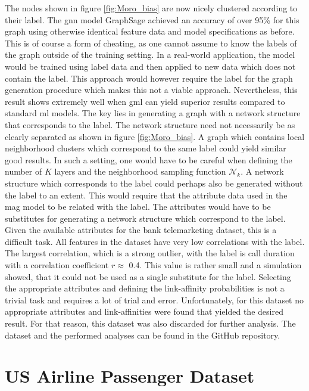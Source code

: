   \noindent The nodes shown in figure \ref{fig:Moro_bias} are now nicely
  clustered according to their label. The \acs{gnn} model GraphSage achieved an 
  accuracy of over 95\% for this graph using otherwise identical feature data
  and model specifications as before. This is of course a form of cheating, as 
  one cannot assume to know the labels of the graph outside of the training 
  setting. In a real-world application, the model would be trained using label
  data and then applied to new data which does not contain the label. This
  approach would however require the label for the graph generation procedure 
  which makes this not a viable approach. Nevertheless, this result shows 
  extremely well when \acs{gml} can yield superior results compared to standard 
  \acs{ml} models. The key lies in generating a graph with a network structure 
  that corresponds to the label. The network structure need not necessarily be 
  as clearly separated as shown in figure \ref{fig:Moro_bias}. A graph which 
  contains local neighborhood clusters which correspond to the same label could 
  yield similar good results. In such a setting, one would have to be careful 
  when defining the number of $K$ layers and the neighborhood sampling function 
  $\mathcal{N}_{k}$. A network structure which corresponds to the label could 
  perhaps also be generated without the label to an extent. This would require
  that the attribute data used in the \acs{mag} model to be related with the
  label. The attributes would have to be substitutes for generating a network
  structure which correspond to the label. Given the available attributes for
  the bank telemarketing dataset, this is a difficult task. All features in the 
  dataset have very low correlations with the label. The largest correlation, 
  which is a strong outlier, with the label is call duration with a correlation 
  coefficient $r\approx$ 0.4. This value is rather small and a simulation showed, 
  that it could not be used as a single substitute for the label. Selecting the
  appropriate attributes and defining the link-affinity probabilities is not a
  trivial task and requires a lot of trial and error. Unfortunately, for this
  dataset no appropriate attributes and link-affinities were found that yielded
  the desired result. For that reason, this dataset was also discarded for
  further analysis. The dataset and the performed analyses can be found in the 
  GitHub repository. 

  \section{US Airline Passenger Dataset}
  \label{section:airline_data}

